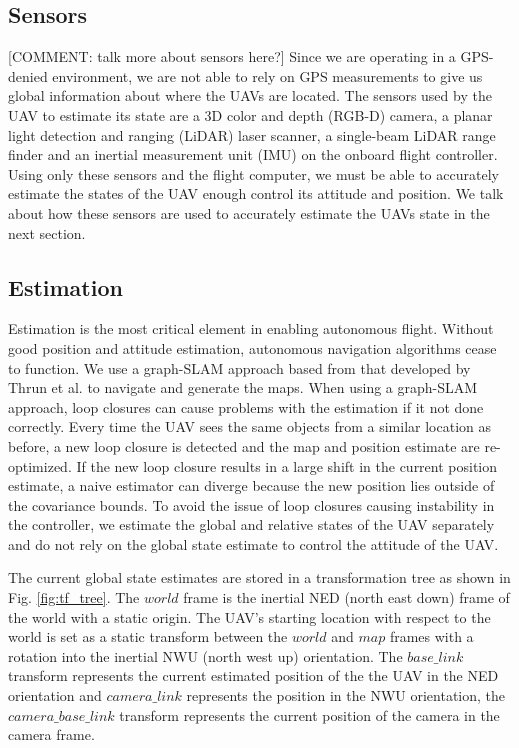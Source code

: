 \documentclass[letterpaper, 10 pt, conference]{ieeeconf}  %
\newcommand{\comment}[1]{{\color{red}[COMMENT: #1]}}
\begin{document}
\subsection{Sensors}

\comment{talk more about sensors here?}
Since we are operating in a GPS-denied environment, we are not able to rely on GPS measurements to give us global information about where the UAVs are located. The sensors used by the UAV to estimate its state are a 3D color and depth (RGB-D) camera, a planar light detection and ranging (LiDAR) laser scanner, a single-beam LiDAR range finder and an inertial measurement unit (IMU) on the onboard flight controller. Using only these sensors and the flight computer, we must be able to accurately estimate the states of the UAV enough control its attitude and position. We talk about how these sensors are used to accurately estimate the UAVs state in the next section.

\subsection{Estimation}

Estimation is the most critical element in enabling autonomous flight. Without good position and attitude estimation, autonomous navigation algorithms cease to function. We use a graph-SLAM approach based from that developed by Thrun et al. \cite{Thrun2006} to navigate and generate the maps. When using a graph-SLAM approach, loop closures can cause problems with the estimation if it not done correctly. Every time the UAV sees the same objects from a similar location as before, a new loop closure is detected and the map and position estimate are re-optimized. If the new loop closure results in a large shift in the current position estimate, a naive estimator can diverge because the new position lies outside of the covariance bounds. To avoid the issue of loop closures causing instability in the controller, we estimate the global and relative states of the UAV separately and do not rely on the global state estimate to control the attitude of the UAV.

The current global state estimates are stored in a transformation tree as shown in Fig. \ref{fig:tf_tree}. The $\mathit{world}$ frame is the inertial NED (north east down) frame of the world with a static origin. The UAV's starting location with respect to the world is set as a static transform between the $\mathit{world}$ and $\mathit{map}$ frames with a rotation into the inertial NWU (north west up) orientation. The $\mathit{base\_link}$ transform represents the current estimated position of the the UAV in the NED orientation and $\mathit{camera\_link}$ represents the position in the NWU orientation, the $\mathit{camera\_base\_link}$ transform represents the current position of the camera in the camera frame.
\end{document}
